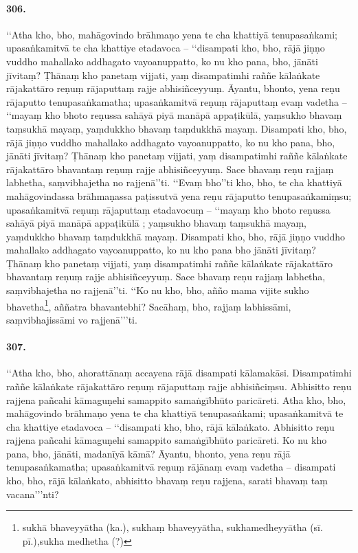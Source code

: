 \paragraph{306.} ‘‘Atha kho, bho, mahāgovindo brāhmaṇo yena te cha khattiyā tenupasaṅkami; upasaṅkamitvā te cha khattiye etadavoca – ‘‘disampati kho, bho, rājā jiṇṇo vuddho mahallako addhagato vayoanuppatto, ko nu kho pana, bho, jānāti jīvitaṃ? Ṭhānaṃ kho panetaṃ vijjati, yaṃ disampatimhi raññe kālaṅkate rājakattāro reṇuṃ rājaputtaṃ rajje abhisiñceyyuṃ. Āyantu, bhonto, yena reṇu rājaputto tenupasaṅkamatha; upasaṅkamitvā reṇuṃ rājaputtaṃ evaṃ vadetha – ‘‘mayaṃ kho bhoto reṇussa sahāyā piyā manāpā appaṭikūlā, yaṃsukho bhavaṃ taṃsukhā mayaṃ, yaṃdukkho bhavaṃ taṃdukkhā mayaṃ. Disampati kho, bho, rājā jiṇṇo vuddho mahallako addhagato vayoanuppatto, ko nu kho pana, bho, jānāti jīvitaṃ? Ṭhānaṃ kho panetaṃ vijjati, yaṃ disampatimhi raññe kālaṅkate rājakattāro bhavantaṃ reṇuṃ rajje abhisiñceyyuṃ. Sace bhavaṃ reṇu rajjaṃ labhetha, saṃvibhajetha no rajjenā’’ti. ‘‘Evaṃ bho’’ti kho, bho, te cha khattiyā mahāgovindassa brāhmaṇassa paṭissutvā yena reṇu rājaputto tenupasaṅkamiṃsu; upasaṅkamitvā reṇuṃ rājaputtaṃ etadavocuṃ – ‘‘mayaṃ kho bhoto reṇussa sahāyā piyā manāpā appaṭikūlā ; yaṃsukho bhavaṃ taṃsukhā mayaṃ, yaṃdukkho bhavaṃ taṃdukkhā mayaṃ. Disampati kho, bho, rājā jiṇṇo vuddho mahallako addhagato vayoanuppatto, ko nu kho pana bho jānāti jīvitaṃ? Ṭhānaṃ kho panetaṃ vijjati, yaṃ disampatimhi raññe kālaṅkate rājakattāro bhavantaṃ reṇuṃ rajje abhisiñceyyuṃ. Sace bhavaṃ reṇu rajjaṃ labhetha, saṃvibhajetha no rajjenā’’ti. ‘‘Ko nu kho, bho, añño mama vijite sukho bhavetha\footnote{sukhā bhaveyyātha (ka.), sukhaṃ bhaveyyātha, sukhamedheyyātha (sī. pī.),sukha medhetha (?)}, aññatra bhavantebhi? Sacāhaṃ, bho, rajjaṃ labhissāmi, saṃvibhajissāmi vo rajjenā’’’ti.

\paragraph{307.} ‘‘Atha kho, bho, ahorattānaṃ accayena rājā disampati kālamakāsi. Disampatimhi raññe kālaṅkate rājakattāro reṇuṃ rājaputtaṃ rajje abhisiñciṃsu. Abhisitto reṇu rajjena pañcahi kāmaguṇehi samappito samaṅgībhūto paricāreti. Atha kho, bho, mahāgovindo brāhmaṇo yena te cha khattiyā tenupasaṅkami; upasaṅkamitvā te cha khattiye etadavoca – ‘‘disampati kho, bho, rājā kālaṅkato. Abhisitto reṇu rajjena pañcahi kāmaguṇehi samappito samaṅgībhūto paricāreti. Ko nu kho pana, bho, jānāti, madanīyā kāmā? Āyantu, bhonto, yena reṇu rājā tenupasaṅkamatha; upasaṅkamitvā reṇuṃ rājānaṃ evaṃ vadetha – disampati kho, bho, rājā kālaṅkato, abhisitto bhavaṃ reṇu rajjena, sarati bhavaṃ taṃ vacana’’’nti?

